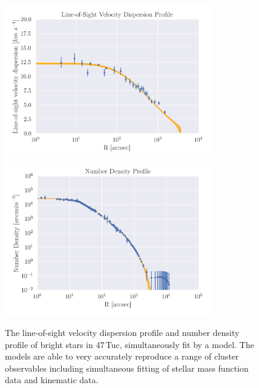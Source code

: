 \begin{figure}
	\centering
	\includegraphics[width=0.8\textwidth]{./figures/limepy_veldisp.png}
	\includegraphics[width=0.8\textwidth]{./figures/limepy_numdens.png}
	\caption{The line-of-sight velocity dispersion profile and number density profile of bright
		stars in 47\,Tuc, simultaneously fit by a  model. The 
		models are able to very accurately reproduce a range of cluster observables
		including simultaneous fitting of stellar mass function data and kinematic data.}
	\label{fig:1/limepy_models}
\end{figure}



